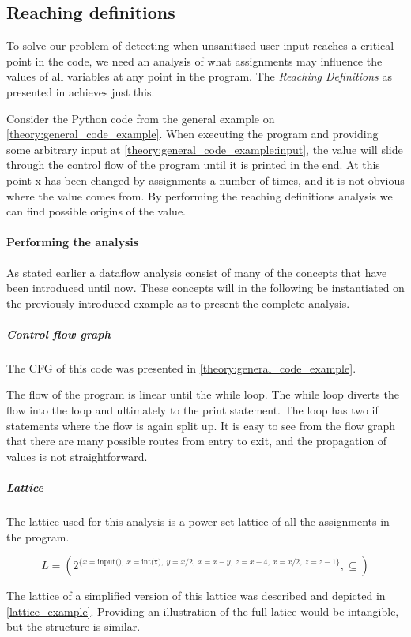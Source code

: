 \subsection{Reaching definitions}\label{theory:reaching}
To solve our problem of detecting when unsanitised user input reaches a critical point in the code, we need an analysis of what assignments may influence the values of all variables at any point in the program.
The \emph{Reaching Definitions} as presented in \citet[p.~26]{schwartzbach} achieves just this.

Consider the Python code from the general example on \cref{theory:general_code_example}.
When executing the program and providing some arbitrary input at \cref{theory:general_code_example:input}, the value will slide through the control flow of the program until it is printed in the end.
At this point x has been changed by assignments a number of times, and it is not obvious where the value comes from.
By performing the reaching definitions analysis we can find possible origins of the value.

\paragraph{Performing the analysis}
As stated earlier a dataflow analysis consist of many of the concepts that have been introduced until now.
These concepts will in the following be instantiated on the previously introduced example as to present the complete analysis.

\subparagraph{Control flow graph}
The CFG of this code was presented in \cref{theory:general_code_example}.

The flow of the program is linear until the while loop.
The while loop diverts the flow into the loop and ultimately to the print statement.
The loop has two if statements where the flow is again split up.
It is easy to see from the flow graph that there are many possible routes from entry to exit, and the propagation of values is not straightforward.

\subparagraph{Lattice}
The lattice used for this analysis is a power set lattice of all the assignments in the program.

\[ L = ( 2^{ \{x = \text{input()}, ~ x = \text{int(x)}, ~ y = x/2, ~ x = x-y, ~ z = x-4, ~ x = x/2, ~ z = z-1 \} } , \subseteq ) \]

The lattice of a simplified version of this lattice was described and depicted in \cref{lattice_example}.
Providing an illustration of the full latice would be intangible, but the structure is similar.

